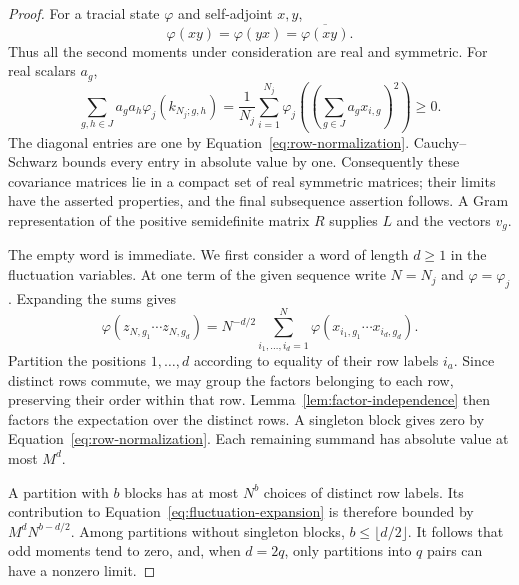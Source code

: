 \begin{proof}
For a tracial state \(\varphi\) and self-adjoint \(x,y\),
\[
 \varphi(xy)=\varphi(yx)
 =\overline{\varphi(xy)}.
\]
Thus all the second moments under consideration are real
and symmetric. For real scalars \(a_g\),
\[
 \sum_{g,h\in J}a_ga_h\varphi_j(k_{N_j;g,h})
 =
 \frac1{N_j}\sum_{i=1}^{N_j}
 \varphi_j\!\left(\left(\sum_{g\in J}a_gx_{i,g}\right)^2\right)
 \geq0.
\]
The diagonal entries are one by
Equation~\eqref{eq:row-normalization}. Cauchy--Schwarz bounds every
entry in absolute value by one. Consequently these covariance
matrices lie in a compact set of real symmetric matrices;
their limits have the asserted properties, and the final
subsequence assertion follows. A Gram representation of
the positive semidefinite matrix \(R\) supplies \(L\) and
the vectors \(v_g\).

The empty word is immediate. We first consider a word of
length \(d\geq1\) in the fluctuation
variables. At one term of the given sequence write
\(N=N_j\) and \(\varphi=\varphi_j\). Expanding the sums gives
\begin{equation}
\label{eq:fluctuation-expansion}
 \varphi(z_{N,g_1}\cdots z_{N,g_d})
 =N^{-d/2}
 \sum_{i_1,\ldots,i_d=1}^N
 \varphi(x_{i_1,g_1}\cdots x_{i_d,g_d}).
\end{equation}
Partition the positions \(1,\ldots,d\) according to equality
of their row labels \(i_a\). Since distinct rows commute,
we may group the factors belonging to each row, preserving
their order within that row. Lemma~\ref{lem:factor-independence}
then factors the expectation over the distinct rows.
A singleton block gives zero by
Equation~\eqref{eq:row-normalization}. Each remaining summand has
absolute value at most \(M^d\).

A partition with \(b\) blocks has at most \(N^b\) choices of
distinct row labels. Its contribution to
Equation~\eqref{eq:fluctuation-expansion} is therefore bounded by
\(M^dN^{b-d/2}\). Among partitions without singleton blocks,
\(b\leq\lfloor d/2\rfloor\). It follows that odd moments
tend to zero, and, when \(d=2q\), only partitions into \(q\)
pairs can have a nonzero limit.


\end{proof}
